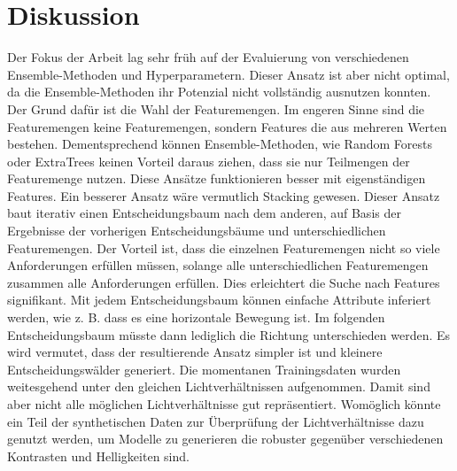 \chapter{Diskussion}
Der Fokus der Arbeit lag sehr früh auf der Evaluierung von verschiedenen Ensemble-Methoden und Hyperparametern. Dieser Ansatz ist aber nicht optimal, da die Ensemble-Methoden ihr Potenzial nicht vollständig
ausnutzen konnten. Der Grund dafür ist die Wahl der Featuremengen. Im engeren Sinne sind die Featuremengen keine Featuremengen, sondern Features die aus mehreren Werten bestehen. Dementsprechend können
Ensemble-Methoden, wie Random Forests oder ExtraTrees keinen Vorteil daraus ziehen, dass sie nur Teilmengen der Featuremenge nutzen. Diese Ansätze funktionieren besser mit eigenständigen Features.
\newline
\newline
Ein besserer Ansatz wäre vermutlich Stacking gewesen. Dieser Ansatz baut iterativ einen Entscheidungsbaum nach dem anderen, auf Basis der Ergebnisse der vorherigen Entscheidungsbäume und
unterschiedlichen Featuremengen. Der Vorteil ist, dass die einzelnen Featuremengen nicht so viele Anforderungen erfüllen müssen, solange alle unterschiedlichen Featuremengen zusammen alle
Anforderungen erfüllen. Dies erleichtert die Suche nach Features signifikant. Mit jedem Entscheidungsbaum können einfache Attribute inferiert werden, wie z. B. dass es eine horizontale Bewegung ist.
Im folgenden Entscheidungsbaum müsste dann lediglich die Richtung unterschieden werden. Es wird vermutet, dass der resultierende Ansatz simpler ist und kleinere Entscheidungswälder generiert.
\newline
\newline
Die momentanen Trainingsdaten wurden weitesgehend unter den gleichen Lichtverhältnissen aufgenommen. Damit sind aber nicht alle möglichen Lichtverhältnisse gut repräsentiert. Womöglich könnte ein
Teil der synthetischen Daten zur Überprüfung der Lichtverhältnisse dazu genutzt werden, um Modelle zu generieren die robuster gegenüber verschiedenen Kontrasten und Helligkeiten sind.